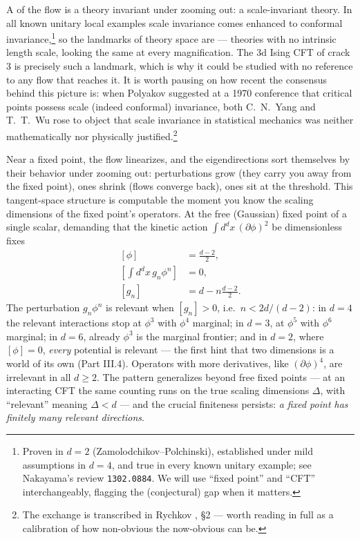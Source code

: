 A  of the flow is a theory invariant under zooming out: a
scale-invariant theory. In all known unitary local examples scale invariance
comes enhanced to conformal invariance,\footnote{Proven in $d=2$
(Zamolodchikov--Polchinski), established under mild assumptions in $d=4$, and
true in every known unitary example; see Nakayama's review \texttt{1302.0884}.
We will use ``fixed point'' and ``CFT'' interchangeably, flagging the
(conjectural) gap when it matters.} so the landmarks of theory space are
 --- theories with no intrinsic length scale,
looking the same at every magnification. The 3d Ising CFT of crack 3 is
precisely such a landmark, which is why it could be studied with no reference to
any flow that reaches it. It is worth pausing on how recent the consensus behind
this picture is: when Polyakov suggested at a 1970 conference that critical
points possess scale (indeed conformal) invariance, both C.~N.~Yang and T.~T.~Wu
rose to object that scale invariance in statistical mechanics was neither
mathematically nor physically justified.\footnote{The exchange is transcribed in
Rychkov , \S2 --- worth reading in full as a calibration of
how non-obvious the now-obvious can be.}

Near a fixed point, the flow linearizes, and the eigendirections sort themselves
by their behavior under zooming out:  perturbations grow (they
carry you away from the fixed point),  ones shrink (flows
converge back),  ones sit at the threshold. This tangent-space
structure is computable the moment you know the scaling dimensions of the fixed
point's operators. At the free (Gaussian) fixed point of a single scalar,
demanding that the kinetic action $\int d^dx\, (\partial\phi)^2$ be
dimensionless fixes
\begin{equation}
\begin{aligned}
[\phi] &= \frac{d-2}{2},\\
\left[\textstyle\int d^dx\, g_n \phi^n\right] &= 0,\\
[g_n] &= d - n\frac{d-2}{2} .
\end{aligned}
\label{eq:power-counting}
\end{equation}
The perturbation $g_n \phi^n$ is relevant when $[g_n] > 0$, i.e.\ $n <
2d/(d-2)$: in $d = 4$ the relevant interactions stop at $\phi^3$ with $\phi^4$
marginal; in $d = 3$, at $\phi^5$ with $\phi^6$ marginal; in $d = 6$, already
$\phi^3$ is the marginal frontier; and in $d = 2$, where $[\phi] = 0$,
\emph{every} potential is relevant --- the first hint that two dimensions is a
world of its own (Part III.4). Operators with more derivatives, like
$(\partial\phi)^4$, are irrelevant in all $d \geq 2$. The pattern generalizes
beyond free fixed points --- at an interacting CFT the same counting runs on the
true scaling dimensions $\Delta$, with ``relevant'' meaning $\Delta < d$ --- and
the crucial finiteness persists: \emph{a fixed point has finitely many relevant
directions}.

